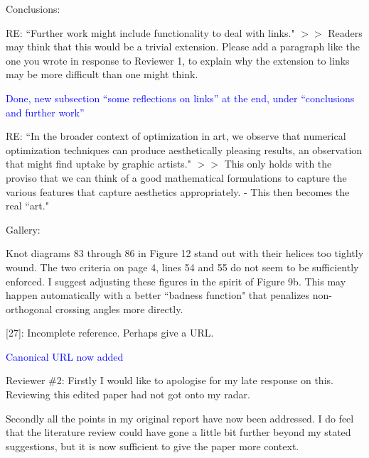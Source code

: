 \documentclass[12pt]{article}
\begin{document}
Conclusions:

RE: ``Further work might include functionality to deal
with links."  $>>$ Readers may think that this would be a trivial
extension.  Please add a paragraph like the one you wrote in response
to Reviewer 1, to explain why the extension to links may be more
difficult than one might think.

\textcolor{blue}{Done, new subsection ``some reflections on links''
  at the end, under ``conclusions and further work''}

RE: ``In the broader context of optimization in art, we observe that
numerical optimization techniques can produce aesthetically pleasing
results, an observation that might find uptake by graphic artists."
$>>$ This only holds with the proviso that we can think of a good
mathematical formulations to capture the various features that capture
aesthetics appropriately.  - This then becomes the real ``art."

Gallery:

Knot diagrams 83 through 86 in Figure 12 stand out with their helices
too tightly wound.  The two criteria on page 4, lines 54 and 55 do not
seem to be sufficiently enforced.  I suggest adjusting these figures
in the spirit of Figure 9b.  This may happen automatically with a
better ``badness function" that penalizes non-orthogonal crossing
angles more directly.

[27]:  Incomplete reference.  Perhaps give a URL.

\textcolor{blue}{Canonical URL now added}


Reviewer \#2: Firstly I would like to apologise for my late response on
this. Reviewing this edited paper had not got onto my radar.

Secondly all the points in my original report have now been
addressed. I do feel that the literature review could have gone a
little bit further beyond my stated suggestions, but it is now
sufficient to give the paper more context.
\end{document}
